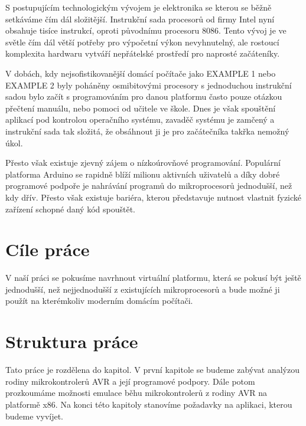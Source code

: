 \begin{introduction}

S postupujícím technologickým vývojem je elektronika se kterou se běžně setkáváme čím dál složitější. Instrukční sada procesorů od firmy Intel nyní obsahuje tisíce instrukcí\cite{x86-instructions}, oproti původnímu procesoru 8086\cite{8086-instructions}. Tento vývoj je ve světle čím dál větší potřeby pro výpočetní výkon nevyhnutelný, ale rostoucí komplexita hardwaru vytváří nepřátelské prostředí pro naprosté začáteníky.

V dobách, kdy nejsofistikovanější domácí počítače jako EXAMPLE 1 nebo EXAMPLE 2 byly poháněny osmibitovými procesory s jednoduchou instrukční sadou bylo začít s programováním pro danou platformu často pouze otázkou přečtení manuálu, nebo pomoci od učitele ve škole. Dnes je však spouštění aplikací pod kontrolou operačního systému, zavaděč systému je zamčený a instrukční sada tak složitá, že obsáhnout ji je pro začátečníka takřka nemožný úkol.

Přesto však existuje zjevný zájem o nízkoúrovňové programování. Populární platforma Arduino se rapidně blíží milionu aktivních uživatelů a díky dobré programové podpoře je nahrávání programů do mikroprocesorů jednodušší, než kdy dřív. Přesto však existuje bariéra, kterou představuje nutnost vlastnit fyzické zařízení schopné daný kód spouštět.

\section{Cíle práce}

V naší práci se pokusíme navrhnout virtuální platformu, která se pokusí být ještě jednodušší, než nejjednodušší z existujících mikroprocesorů a bude možné ji použít na kterémkoliv moderním domácím počítači.


\section{Struktura práce}

Tato práce je rozdělena do  kapitol. V první kapitole se budeme zabývat analýzou rodiny mikrokontrolerů AVR a její programové podpory. Dále potom prozkoumáme možnosti emulace běhu mikrokontrolerů z rodiny AVR na platformě x86. Na konci této kapitoly stanovíme požadavky na aplikaci, kterou budeme vyvíjet.


\end{introduction}
